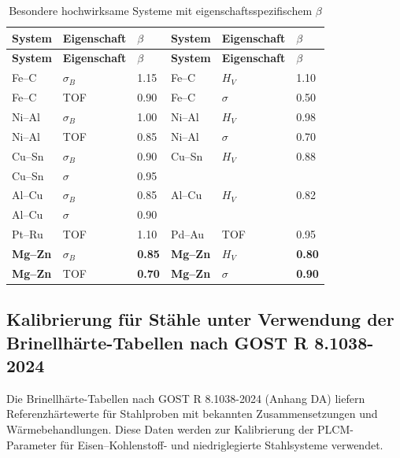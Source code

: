 \documentclass[12pt,a4paper]{article}
\begin{document}
	\begin{longtable}{p{2.2cm} p{2.2cm} p{1.2cm} p{2.2cm} p{2.2cm} p{1.2cm}}
		\caption{Besondere hochwirksame Systeme mit eigenschaftsspezifischem $\beta$}\label{tab:beta_special}\\
		\toprule
		\textbf{System} & \textbf{Eigenschaft} & $\beta$ & \textbf{System} & \textbf{Eigenschaft} & $\beta$ \\
		\midrule
		\endfirsthead
		\toprule
		\textbf{System} & \textbf{Eigenschaft} & $\beta$ & \textbf{System} & \textbf{Eigenschaft} & $\beta$ \\
		\midrule
		\endhead
		Fe–C  & $\sigma_B$ & 1.15 & Fe–C  & $H_V$ & 1.10 \\
		Fe–C  & TOF & 0.90 & Fe–C  & $\sigma$ & 0.50 \\
		Ni–Al & $\sigma_B$ & 1.00 & Ni–Al & $H_V$ & 0.98 \\
		Ni–Al & TOF & 0.85 & Ni–Al & $\sigma$ & 0.70 \\
		Cu–Sn & $\sigma_B$ & 0.90 & Cu–Sn & $H_V$ & 0.88 \\
		Cu–Sn & $\sigma$ & 0.95 & & & \\
		Al–Cu & $\sigma_B$ & 0.85 & Al–Cu & $H_V$ & 0.82 \\
		Al–Cu & $\sigma$ & 0.90 & & & \\
		Pt–Ru & TOF & 1.10 & Pd–Au & TOF & 0.95 \\
		\rowcolor{gray!10}
		\textbf{Mg–Zn} & $\sigma_B$ & \textbf{0.85} & \textbf{Mg–Zn} & $H_V$ & \textbf{0.80} \\
		\textbf{Mg–Zn} & TOF & \textbf{0.70} & \textbf{Mg–Zn} & $\sigma$ & \textbf{0.90} \\
		\bottomrule
	\end{longtable}
	
	
	\subsection{Kalibrierung für Stähle unter Verwendung der Brinellhärte-Tabellen nach GOST R 8.1038-2024}
	\label{subsec:steel_calibration}
	
	Die Brinellhärte-Tabellen nach GOST R 8.1038-2024 (Anhang DA) liefern Referenzhärtewerte für Stahlproben mit bekannten Zusammensetzungen und Wärmebehandlungen. Diese Daten werden zur Kalibrierung der PLCM-Parameter für Eisen–Kohlenstoff- und niedriglegierte Stahlsysteme verwendet.
	
\end{document}
